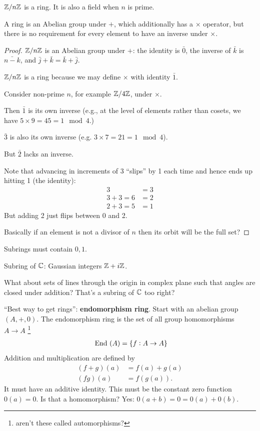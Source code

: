 \begin{claim}
  $\mathbb{Z}/n\mathbb{Z}$ is a ring. It is also a field when $n$ is prime.
\end{claim}

\begin{definition}
  A ring is an Abelian group under $+$, which additionally has a $\times$ operator, but there is no requirement
  for every element to have an inverse under $\times$.
\end{definition}

\begin{proof}
  $\mathbb{Z}/n\mathbb{Z}$ is an Abelian group under $+$: the identity is $\bar 0$, the inverse of $\bar k$ is $\bar{n - k}$, and $\bar j + \bar k = \bar k +\bar j$.

  $\mathbb{Z}/n\mathbb{Z}$ is a ring because we may define $\times$ with identity $\bar 1$.

  Consider non-prime $n$, for example $\mathbb{Z}/4\mathbb{Z}$, under $\times$.

  Then $\bar 1$ is its own inverse (e.g., at the level of elements rather than cosets, we
  have $5 \times 9 = 45 = 1 \mod 4$.)

  $\bar 3$ is also its own inverse (e.g. $3 \times 7 = 21 = 1 \mod 4$).

  But $\bar 2$ lacks an inverse.

  Note that advancing in increments of 3 ``slips​'' by 1 each time and hence ends up hitting 1 (the identity):
  \begin{align*}
    3             &= 3 \\
    3 + 3     = 6 &= 2 \\
    2 + 3     = 5 &= 1
  \end{align*}
  But adding 2 just flips between 0 and 2.

  Basically if an element is not a divisor of $n$ then its orbit will be the full set?
\end{proof}


Subrings must contain $0, 1$.

Subring of $\mathbb{C}$: Gaussian integers $\mathbb{Z} + i\mathbb{Z}$.

What about sets of lines through the origin in complex plane such that angles
are closed under addition? That's a subring of $\mathbb{C}$ too right?

``Best way to get rings'': \textbf{endomorphism ring}. Start with an abelian
group $(A, +, 0)$. The endomorphism ring is the set of all group homomorphisms
$A \to A$ \footnote{aren't these called automorphisms?}
\begin{align*}
~\text{End}~(A) = \{f: A \to A\}
\end{align*}
Addition and multiplication are defined by
\begin{align*}
  (f + g)(a) &= f(a) + g(a)\\
  (fg)(a)    &= f(g(a)).
\end{align*}
It must have an additive identity. This must be the constant zero function
$0(a) = 0$. Is that a homomorphism? Yes: $0(a + b) = 0 = 0(a) + 0(b)$.

